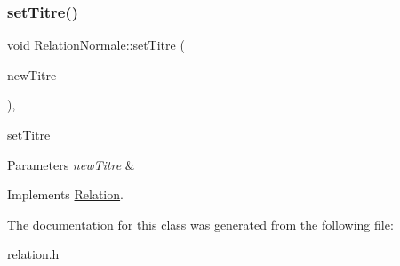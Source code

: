 \subsubsection{\texorpdfstring{set\+Titre()}{setTitre()}}
{\footnotesize\ttfamily void Relation\+Normale\+::set\+Titre (\begin{DoxyParamCaption}\item[{const Q\+String \&}]{new\+Titre }\end{DoxyParamCaption})\hspace{0.3cm}{\ttfamily [inline]}, {\ttfamily [virtual]}}



set\+Titre 


\begin{DoxyParams}{Parameters}
{\em new\+Titre} & \\
\hline
\end{DoxyParams}


Implements \hyperlink{class_relation_a1c08a802796f5fccaa5732ec1a96e542}{Relation}.



The documentation for this class was generated from the following file\+:\begin{DoxyCompactItemize}
\item 
relation.\+h\end{DoxyCompactItemize}
